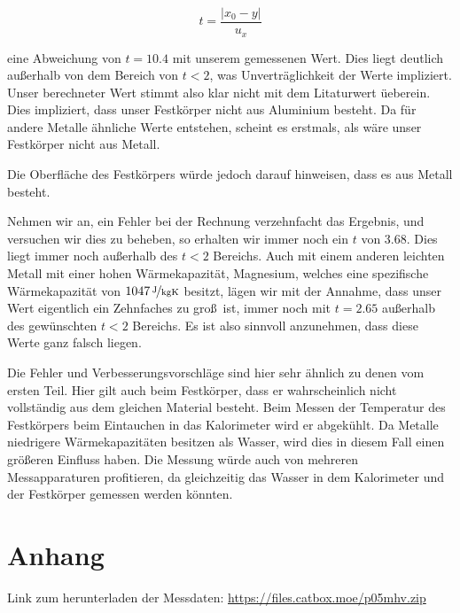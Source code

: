 \documentclass[11pt,a4paper]{article}
\begin{document}
\begin{equation}
t=\frac{|x_0-y|}{u_x}\label{abw}
\end{equation}

eine Abweichung von $t=10.4$ mit unserem gemessenen Wert. Dies liegt deutlich au\ss erhalb von dem Bereich von $t<2$, was Unvertr\"aglichkeit der Werte impliziert. Unser berechneter Wert stimmt also klar nicht mit dem Litaturwert \"ueberein. Dies impliziert, dass unser Festk\"orper nicht aus Aluminium besteht. Da f\"ur andere Metalle \"ahnliche Werte entstehen, scheint es erstmals, als w\"are unser Festk\"orper nicht aus Metall.

Die Oberfl\"ache des Festk\"orpers w\"urde jedoch darauf hinweisen, dass es aus Metall besteht.

Nehmen wir an, ein Fehler bei der Rechnung verzehnfacht das Ergebnis, und versuchen wir dies zu beheben, so erhalten wir immer noch ein $t$ von 3.68. Dies liegt immer noch au\ss erhalb des $t<2$ Bereichs. Auch mit einem anderen leichten Metall mit einer hohen W\"armekapazit\"at, Magnesium, welches eine spezifische W\"armekapazit\"at von $1047\,\nicefrac{\mathrm{J}}{\mathrm{kgK}}$ besitzt, l\"agen wir mit der Annahme, dass unser Wert eigentlich ein Zehnfaches zu gro\ss\ ist, immer noch mit $t=2.65$ au\ss erhalb des gew\"unschten $t<2$ Bereichs.  Es ist also sinnvoll anzunehmen, dass diese Werte ganz falsch liegen.

Die Fehler und Verbesserungsvorschl\"age sind hier sehr \"ahnlich zu denen vom ersten Teil. Hier gilt auch beim Festk\"orper, dass er wahrscheinlich nicht vollst\"andig aus dem gleichen Material besteht. Beim Messen der Temperatur des Festk\"orpers beim Eintauchen in das Kalorimeter wird er abgek\"uhlt. Da Metalle niedrigere W\"armekapazit\"aten besitzen als Wasser, wird dies in diesem Fall einen gr\"o\ss eren Einfluss haben. Die Messung w\"urde auch von mehreren Messapparaturen profitieren, da  gleichzeitig das Wasser in dem Kalorimeter und der Festk\"orper gemessen werden k\"onnten.


\vspace{55pt}
\section{Anhang}
Link zum herunterladen der Messdaten: \url{https://files.catbox.moe/p05mhv.zip}
\vspace{22pt}
\end{document}
